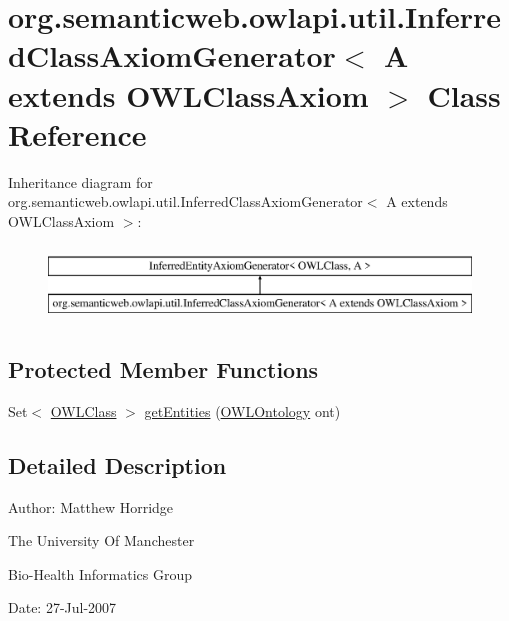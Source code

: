 \hypertarget{classorg_1_1semanticweb_1_1owlapi_1_1util_1_1_inferred_class_axiom_generator_3_01_a_01extends_01_o_w_l_class_axiom_01_4}{\section{org.\-semanticweb.\-owlapi.\-util.\-Inferred\-Class\-Axiom\-Generator$<$ A extends O\-W\-L\-Class\-Axiom $>$ Class Reference}
\label{classorg_1_1semanticweb_1_1owlapi_1_1util_1_1_inferred_class_axiom_generator_3_01_a_01extends_01_o_w_l_class_axiom_01_4}
}
Inheritance diagram for org.\-semanticweb.\-owlapi.\-util.\-Inferred\-Class\-Axiom\-Generator$<$ A extends O\-W\-L\-Class\-Axiom $>$\-:\begin{figure}[H]
\begin{center}
\leavevmode
\includegraphics[height=2.000000cm]{classorg_1_1semanticweb_1_1owlapi_1_1util_1_1_inferred_class_axiom_generator_3_01_a_01extends_01_o_w_l_class_axiom_01_4}
\end{center}
\end{figure}
\subsection*{Protected Member Functions}
\begin{DoxyCompactItemize}
\item 
Set$<$ \hyperlink{interfaceorg_1_1semanticweb_1_1owlapi_1_1model_1_1_o_w_l_class}{O\-W\-L\-Class} $>$ \hyperlink{classorg_1_1semanticweb_1_1owlapi_1_1util_1_1_inferred_class_axiom_generator_3_01_a_01extends_01_o_w_l_class_axiom_01_4_abe095d31cdaf0b6231efb46a7281d3a7}{get\-Entities} (\hyperlink{interfaceorg_1_1semanticweb_1_1owlapi_1_1model_1_1_o_w_l_ontology}{O\-W\-L\-Ontology} ont)
\end{DoxyCompactItemize}


\subsection{Detailed Description}
Author\-: Matthew Horridge\par
 The University Of Manchester\par
 Bio-\/\-Health Informatics Group\par
 Date\-: 27-\/\-Jul-\/2007\par
\par
 
